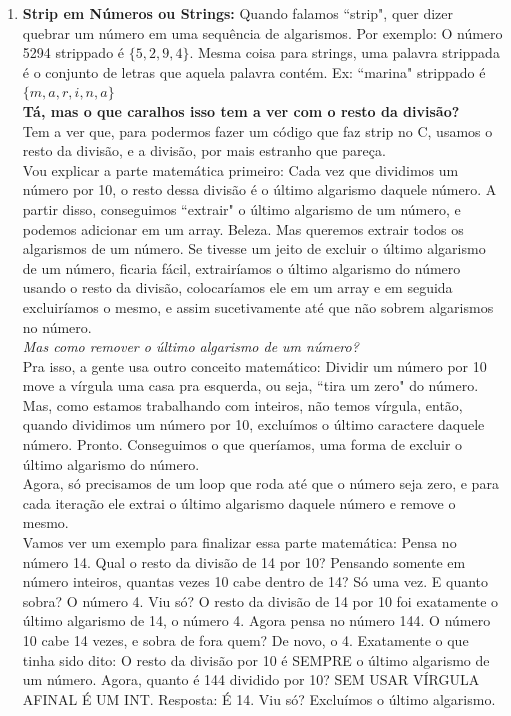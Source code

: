\documentclass{article}
\begin{document}
\begin{enumerate}
    \item \textbf{Strip em Números ou Strings:} Quando falamos ``strip", quer dizer quebrar um número em uma sequência de algarismos. Por exemplo: O número 5294 strippado é $\{5, 2, 9, 4\}$. Mesma coisa para strings, uma palavra strippada é o conjunto de letras que aquela palavra contém. Ex: ``marina" strippado é $\{m, a, r, i, n, a\}$
    \\[3pt]
    \textbf{Tá, mas o que caralhos isso tem a ver com o resto da divisão?}
    \\[3pt]
    Tem a ver que, para podermos fazer um código que faz strip no C, usamos o resto da divisão, e a divisão, por mais estranho que pareça.
    \\[3pt]
    Vou explicar a parte matemática primeiro: Cada vez que dividimos um número por 10, o resto dessa divisão é o último algarismo daquele número. A partir disso, conseguimos ``extrair" o último algarismo de um número, e podemos adicionar em um array. Beleza. Mas queremos extrair todos os algarismos de um número. Se tivesse um jeito de excluir o último algarismo de um número, ficaria fácil, extrairíamos o último algarismo do número usando o resto da divisão, colocaríamos ele em um array e em seguida excluiríamos o mesmo, e assim sucetivamente até que não sobrem algarismos no número.
    \\[3pt]
    \textit{Mas como remover o último algarismo de um número?} 
    \\[3pt]
    Pra isso, a gente usa outro conceito matemático: Dividir um número por 10 move a vírgula uma casa pra esquerda, ou seja, ``tira um zero" do número. Mas, como estamos trabalhando com inteiros, não temos vírgula, então, quando dividimos um número por 10, excluímos o último caractere daquele número. Pronto. Conseguimos o que queríamos, uma forma de excluir o último algarismo do número.
    \\[3pt]
    Agora, só precisamos de um loop que roda até que o número seja zero, e para cada iteração ele extrai o último algarismo daquele número e remove o mesmo.
    \\[3pt]
    Vamos ver um exemplo para finalizar essa parte matemática: Pensa no número 14. Qual o resto da divisão de 14 por 10? Pensando somente em número inteiros, quantas vezes 10 cabe dentro de 14? Só uma vez. E quanto sobra? O número 4. Viu só? O resto da divisão de 14 por 10 foi exatamente o último algarismo de 14, o número 4. Agora pensa no número 144. O número 10 cabe 14 vezes, e sobra de fora quem? De novo, o 4. Exatamente o que tinha sido dito: O resto da divisão por 10 é SEMPRE o último algarismo de um número. Agora, quanto é 144 dividido por 10? SEM USAR VÍRGULA AFINAL É UM INT. Resposta: É 14. Viu só? Excluímos o último algarismo. 

\end{enumerate}
\end{document}
